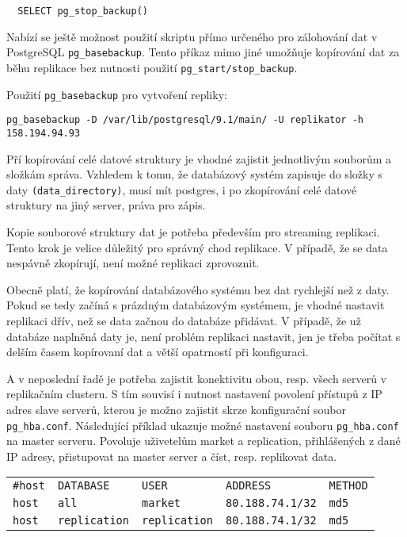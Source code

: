 \begin{lstlisting}
  SELECT pg_stop_backup()
\end{lstlisting}

Nabízí se ještě možnost použití skriptu přímo určeného pro zálohování dat v PostgreSQL \texttt{pg\_basebackup}. Tento příkaz mimo jiné umožňuje kopírování dat za běhu replikace bez nutnosti použití \texttt{pg\_start/stop\_backup}.

Použití \texttt{pg\_basebackup} pro vytvoření repliky:

\begin{lstlisting}[keywordstyle=\bfseries\color{purpurova7},identifierstyle=\color{black},stringstyle=\color{black}]
  pg_basebackup -D /var/lib/postgresql/9.1/main/ -U replikator -h 158.194.94.93
\end{lstlisting}

Pří kopírování celé datové struktury je vhodné zajistit jednotlivým souborům a složkám správa. Vzhledem k tomu, že databázový systém zapisuje do složky s daty \texttt{(data\_directory)}, musí mít postgres, i po zkopírování celé datové struktury na jiný server, práva pro zápis.

Kopie souborové struktury dat je potřeba především pro streaming replikaci. Tento krok je velice důležitý pro správný chod replikace. V případě, že se data nespávně zkopírují, není možné replikaci zprovoznit. 

Obecně platí, že kopírování databázového systému bez dat rychlejší než z daty. Pokud se tedy začíná s prázdným databázovým systémem, je vhodné nastavit replikaci dřív, než se data začnou do databáze přidávat. V případě, že už databáze naplněná daty je, není problém replikaci nastavit, jen je třeba počítat s delším časem kopírovaní dat a větší opatrností při konfiguraci. 

 A v neposlední řadě je potřeba zajistit konektivitu obou, resp. všech serverů v replikačním clusteru. S tím souvisí i nutnost nastavení povolení přístupů z IP adres slave serverů, kterou je možno zajistit skrze konfigurační soubor \texttt{pg\_hba.conf}. Následující příklad ukazuje možné nastavení souboru \texttt{pg\_hba.conf} na master serveru. Povoluje uživetelům market a replication, přihlášených z dané IP adresy, přistupovat na master server a číst, resp. replikovat data.

      \begin{table}[H]
        \label{pgHba}
          \begin{center}
            \begin{tabular}{lllll}
              \texttt{\#host} & \texttt{DATABASE} & \texttt{USER} & \texttt{ADDRESS} & \texttt{METHOD} \\
                \texttt{host} & \texttt{all} & \texttt{market} & \texttt{80.188.74.1/32} & \texttt{md5} \\
       \texttt{host} & \texttt{replication} & \texttt{replication} & \texttt{80.188.74.1/32} &	\texttt{md5} \\
            \end{tabular}
          \end{center}
      \end{table}

